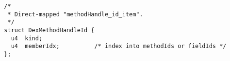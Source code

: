 {\tiny \begin{verbatim}
  /*
   * Direct-mapped "methodHandle_id_item".
   */
  struct DexMethodHandleId {
    u4  kind;
    u4  memberIdx;          /* index into methodIds or fieldIds */
  };
\end{verbatim} }